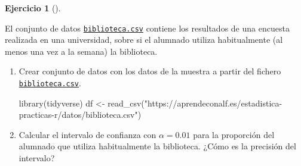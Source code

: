 \documentclass[
  a4paper,
]{scrreport}
\newenvironment{Shaded}{\begin{snugshade}}{\end{snugshade}}
\newcommand{\FunctionTok}[1]{\textcolor[rgb]{0.28,0.35,0.67}{#1}}
\newcommand{\NormalTok}[1]{\textcolor[rgb]{0.00,0.23,0.31}{#1}}
\newcommand{\OtherTok}[1]{\textcolor[rgb]{0.00,0.23,0.31}{#1}}
\newcommand{\StringTok}[1]{\textcolor[rgb]{0.13,0.47,0.30}{#1}}
\theoremstyle{definition}
\newtheorem{exercise}{Ejercicio}[chapter]
\theoremstyle{remark}
\begin{document}
\begin{exercise}[]\protect\hypertarget{exr-uso-biblioteca}{}\label{exr-uso-biblioteca}

El conjunto de datos
\href{https://aprendeconalf.es/estadistica-practicas-r/datos/biblioteca.csv}{\texttt{biblioteca.csv}}
contiene los resultados de una encuesta realizada en una universidad,
sobre si el alumnado utiliza habitualmente (al menos una vez a la
semana) la biblioteca.

\begin{enumerate}
\def\labelenumi{\alph{enumi}.}
\item
  Crear conjunto de datos con los datos de la muestra a partir del
  fichero
  \href{https://aprendeconalf.es/estadistica-practicas-r/datos/biblioteca.csv}{\texttt{biblioteca.csv}}.

  \begin{tcolorbox}[enhanced jigsaw, breakable, toptitle=1mm, colbacktitle=quarto-callout-tip-color!10!white, rightrule=.15mm, opacityback=0, opacitybacktitle=0.6, titlerule=0mm, coltitle=black, colframe=quarto-callout-tip-color-frame, colback=white, bottomtitle=1mm, leftrule=.75mm, toprule=.15mm, title=\textcolor{quarto-callout-tip-color}{\faLightbulb}\hspace{0.5em}{Solución}, arc=.35mm, bottomrule=.15mm, left=2mm]

\begin{Shaded}
\begin{Highlighting}[]
\FunctionTok{library}\NormalTok{(tidyverse)}
\NormalTok{df }\OtherTok{\textless{}{-}} \FunctionTok{read\_csv}\NormalTok{(}\StringTok{"https://aprendeconalf.es/estadistica{-}practicas{-}r/datos/biblioteca.csv"}\NormalTok{)}
\end{Highlighting}
\end{Shaded}

  \end{tcolorbox}
\item
  Calcular el intervalo de confianza con \(\alpha=0.01\) para la
  proporción del alumnado que utiliza habitualmente la biblioteca. ¿Cómo
  es la precisión del intervalo?

  \begin{tcolorbox}[enhanced jigsaw, breakable, toptitle=1mm, colbacktitle=quarto-callout-note-color!10!white, rightrule=.15mm, opacityback=0, opacitybacktitle=0.6, titlerule=0mm, coltitle=black, colframe=quarto-callout-note-color-frame, colback=white, bottomtitle=1mm, leftrule=.75mm, toprule=.15mm, title=\textcolor{quarto-callout-note-color}{\faInfo}\hspace{0.5em}{Ayuda}, arc=.35mm, bottomrule=.15mm, left=2mm]


\end{tcolorbox}
\end{enumerate}
\end{exercise}
\end{document}
